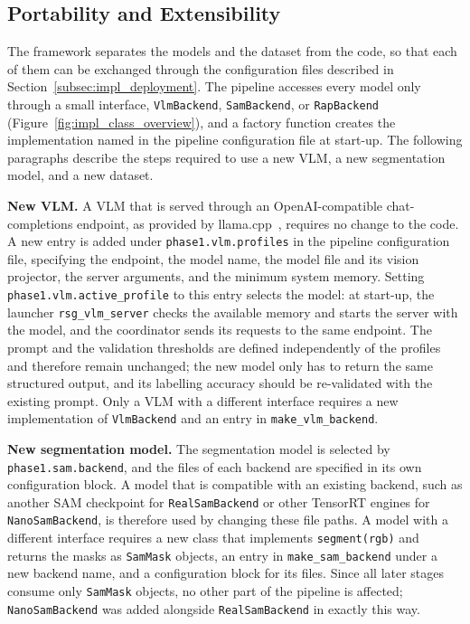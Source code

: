 \subsection{Portability and Extensibility}
\label{subsec:impl_portability}

{\small The framework separates the models and the dataset from the code, so that each of them can be exchanged through the configuration files described in Section~\ref{subsec:impl_deployment}. The pipeline accesses every model only through a small interface, \texttt{VlmBackend}, \texttt{SamBackend}, or \texttt{RapBackend} (Figure~\ref{fig:impl_class_overview}), and a factory function creates the implementation named in the pipeline configuration file at start-up. The following paragraphs describe the steps required to use a new VLM, a new segmentation model, and a new dataset.\par}

{\small \textbf{New VLM.} A VLM that is served through an OpenAI-compatible chat-completions endpoint, as provided by llama.cpp~\cite{llamacpp}, requires no change to the code. A new entry is added under \texttt{phase1.\allowbreak{}vlm.\allowbreak{}profiles} in the pipeline configuration file, specifying the endpoint, the model name, the model file and its vision projector, the server arguments, and the minimum system memory. Setting \texttt{phase1.\allowbreak{}vlm.\allowbreak{}active\_\allowbreak{}profile} to this entry selects the model: at start-up, the launcher \texttt{rsg\_\allowbreak{}vlm\_\allowbreak{}server} checks the available memory and starts the server with the model, and the coordinator sends its requests to the same endpoint. The prompt and the validation thresholds are defined independently of the profiles and therefore remain unchanged; the new model only has to return the same structured output, and its labelling accuracy should be re-validated with the existing prompt. Only a VLM with a different interface requires a new implementation of \texttt{VlmBackend} and an entry in \texttt{make\_\allowbreak{}vlm\_\allowbreak{}backend}.\par}

{\small \textbf{New segmentation model.} The segmentation model is selected by \texttt{phase1.\allowbreak{}sam.\allowbreak{}backend}, and the files of each backend are specified in its own configuration block. A model that is compatible with an existing backend, such as another SAM checkpoint for \texttt{RealSamBackend} or other TensorRT engines for \texttt{NanoSamBackend}, is therefore used by changing these file paths. A model with a different interface requires a new class that implements \texttt{segment(rgb)} and returns the masks as \texttt{SamMask} objects, an entry in \texttt{make\_\allowbreak{}sam\_\allowbreak{}backend} under a new backend name, and a configuration block for its files. Since all later stages consume only \texttt{SamMask} objects, no other part of the pipeline is affected; \texttt{NanoSamBackend} was added alongside \texttt{RealSamBackend} in exactly this way.\par}

